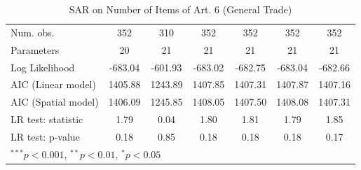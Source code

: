 \begin{table}[!h]
\begin{center}
\begin{tabular}{l c c c c c c }
Num. obs.               & 352           & 310          & 352           & 352           & 352           & 352           \\
Parameters              & 20            & 21           & 21            & 21            & 21            & 21            \\
Log Likelihood          & -683.04       & -601.93      & -683.02       & -682.75       & -683.04       & -682.66       \\
AIC (Linear model)      & 1405.88       & 1243.89      & 1407.85       & 1407.31       & 1407.87       & 1407.16       \\
AIC (Spatial model)     & 1406.09       & 1245.85      & 1408.05       & 1407.50       & 1408.08       & 1407.31       \\
LR test: statistic      & 1.79          & 0.04         & 1.80          & 1.81          & 1.79          & 1.85          \\
LR test: p-value        & 0.18          & 0.85         & 0.18          & 0.18          & 0.18          & 0.17          \\
\bottomrule
\multicolumn{7}{l}{\scriptsize{$^{***}p<0.001$, $^{**}p<0.01$, $^*p<0.05$}}
\end{tabular}
\caption{SAR on Number of Items of Art. 6 (General Trade)}
\label{table:coefficients}
\end{center}
\end{table}
